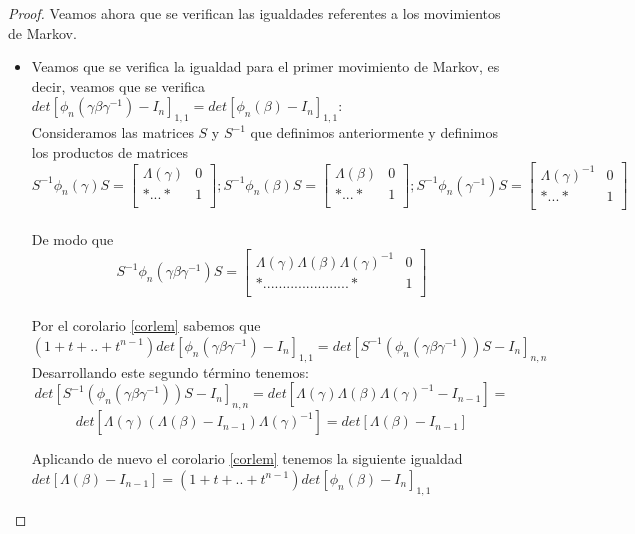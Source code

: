 \documentclass[14pt]{extarticle}
\begin{document}
\begin{proof}
 	 Veamos ahora que se verifican las igualdades referentes a los movimientos de Markov.
 	 \begin{itemize}
 	 	\item 
 	 Veamos que se verifica la igualdad para el primer movimiento de Markov, es decir, veamos que se verifica $ det[\phi_{n}(\gamma\beta\gamma^{-1}) - I_{n}]_{1,1} = det[\phi_{n}(\beta) - I_{n}]_{1,1}$:\\
 	 Consideramos las matrices $ S $ y $ S^{-1} $ que definimos anteriormente y definimos los productos de matrices     
 	 \[S^{-1}\phi_{n}(\gamma)S = \left[\begin{array}{r|r}
 	 \Lambda (\gamma) & 0 \\ \hline	
 	 * ... * & 1\\
 	 \end{array}\right];
 	 S^{-1}\phi_{n}(\beta)S = \left[\begin{array}{r|r}
 	 \Lambda (\beta) & 0 \\ \hline	
 	 * ... * & 1\\
 	 \end{array}\right];
 	 S^{-1}\phi_{n}(\gamma^{-1})S = \left[\begin{array}{r|r}
 	 \Lambda (\gamma)^{-1} & 0 \\ \hline	
 	 * ... * & 1\\
 	 \end{array}\right]\]\\
 	 
 	 De modo que  	 
 	 \[ S^{-1}\phi_{n}(\gamma\beta\gamma^{-1})S = \left[\begin{array}{r|r}
 	 \Lambda (\gamma)\Lambda (\beta)\Lambda (\gamma)^{-1} & 0 \\ \hline	
 	 * ...................... * & 1\\
 	 \end{array}\right]\]\\
	 Por el corolario \ref{corlem} sabemos que \\
	 $ (1+t+..+ t^{n-1} ) det[ \phi_{n}(\gamma\beta\gamma^{-1}) - I_{n}] _{1,1} = det[S^{-1}(\phi_{n}(\gamma\beta\gamma^{-1}))S-I_{n}]_{n,n}$\\
	 
	 Desarrollando este segundo término tenemos:
	 \[det[S^{-1}(\phi_{n}(\gamma\beta\gamma^{-1}))S-I_{n}]_{n,n} = det[\Lambda (\gamma)\Lambda (\beta)\Lambda (\gamma)^{-1}-I_{n-1}] =\]
	 \[
	 det[\Lambda (\gamma)(\Lambda (\beta)-I_{n-1})\Lambda (\gamma)^{-1}] =
	 det[\Lambda (\beta)-I_{n-1}] \]
	 
	 Aplicando de nuevo el corolario \ref{corlem} tenemos la siguiente igualdad\\
	 $det[\Lambda (\beta)-I_{n-1}]  = (1+t+..+ t^{n-1} ) det[ \phi_{n}(\beta) - I_{n}] _{1,1} $\\
	 

\end{itemize}
\end{proof}
\end{document}
